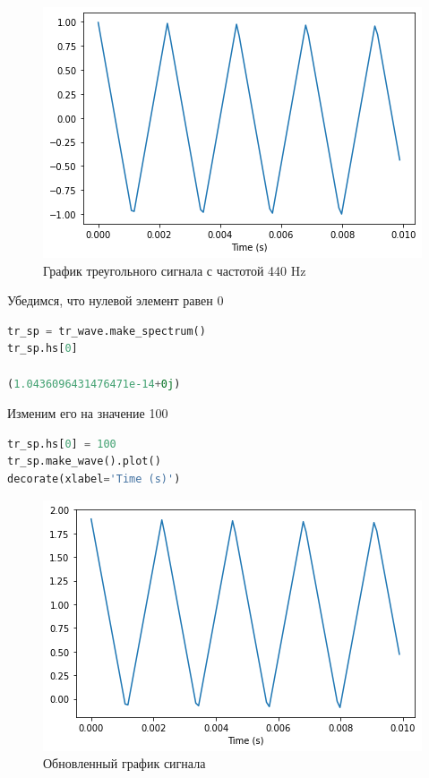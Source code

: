 \begin{figure}[H]
	\begin{center}
		\includegraphics[scale=1]{fig/lab02/lab02_08.png}
		\caption{График треугольного сигнала с частотой 440 Hz}
	\end{center}
\end{figure}

Убедимся, что нулевой элемент равен 0

\begin{lstlisting}[language=Python]
tr_sp = tr_wave.make_spectrum()
tr_sp.hs[0]

(1.0436096431476471e-14+0j)
\end{lstlisting}

Изменим его на значение 100

\begin{lstlisting}[language=Python]
tr_sp.hs[0] = 100
tr_sp.make_wave().plot()
decorate(xlabel='Time (s)')
\end{lstlisting}

\begin{figure}[H]
	\begin{center}
		\includegraphics[scale=1]{fig/lab02/lab02_09.png}
		\caption{Обновленный график сигнала}
	\end{center}
\end{figure}


